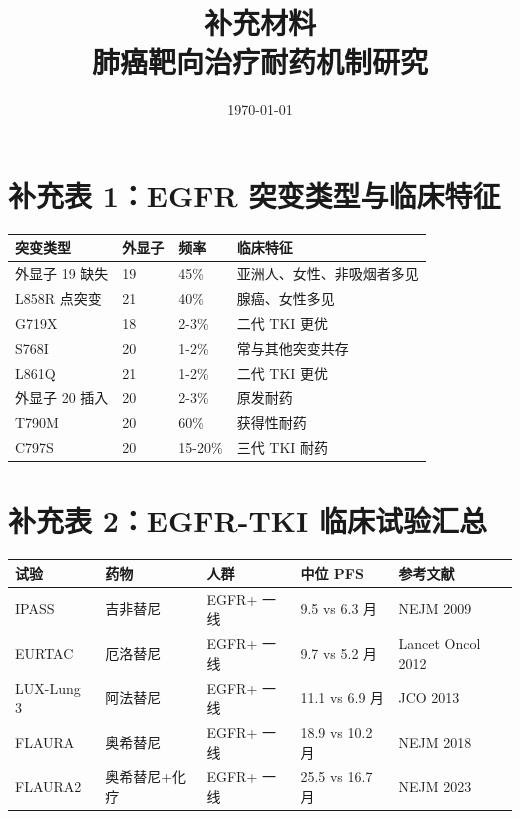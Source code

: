 \documentclass[12pt,a4paper]{article}
\title{\heiti\Large 补充材料\\[0.5em]\normalsize 肺癌靶向治疗耐药机制研究}
\date{\today}
\begin{document}
\maketitle
\tableofcontents
\newpage

\section{补充表 1：EGFR 突变类型与临床特征}

\begin{table}[h]
\centering
\begin{tabular}{p{3cm}p{2cm}p{2cm}p{4cm}}
\toprule
\textbf{突变类型} & \textbf{外显子} & \textbf{频率} & \textbf{临床特征} \\
\midrule
外显子 19 缺失 & 19 & 45\% & 亚洲人、女性、非吸烟者多见 \\
L858R 点突变 & 21 & 40\% & 腺癌、女性多见 \\
G719X & 18 & 2-3\% & 二代 TKI 更优 \\
S768I & 20 & 1-2\% & 常与其他突变共存 \\
L861Q & 21 & 1-2\% & 二代 TKI 更优 \\
外显子 20 插入 & 20 & 2-3\% & 原发耐药 \\
T790M & 20 & 60\% & 获得性耐药 \\
C797S & 20 & 15-20\% & 三代 TKI 耐药 \\
\bottomrule
\end{tabular}
\end{table}

\newpage

\section{补充表 2：EGFR-TKI 临床试验汇总}

\begin{table}[h]
\centering
\begin{tabular}{p{2cm}p{2cm}p{2.5cm}p{2cm}p{2.5cm}}
\toprule
\textbf{试验} & \textbf{药物} & \textbf{人群} & \textbf{中位 PFS} & \textbf{参考文献} \\
\midrule
IPASS & 吉非替尼 & EGFR+ 一线 & 9.5 vs 6.3 月 & NEJM 2009 \\
EURTAC & 厄洛替尼 & EGFR+ 一线 & 9.7 vs 5.2 月 & Lancet Oncol 2012 \\
LUX-Lung 3 & 阿法替尼 & EGFR+ 一线 & 11.1 vs 6.9 月 & JCO 2013 \\
FLAURA & 奥希替尼 & EGFR+ 一线 & 18.9 vs 10.2 月 & NEJM 2018 \\
FLAURA2 & 奥希替尼+化疗 & EGFR+ 一线 & 25.5 vs 16.7 月 & NEJM 2023 \\
\bottomrule
\end{tabular}
\end{table}
\end{document}
